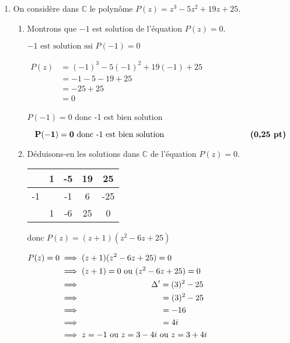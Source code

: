 \documentclass[12pt,a4paper]{article}
\begin{document}
\begin{enumerate}
    \item On considère dans \( \mathbb{C} \) le polynôme \( P(z) = z^3 - 5z^2 + 19z + 25 \).
    \begin{enumerate}
        \item Montrons que \( -1 \) est solution de l’équation \( P(z) = 0 \). 
        
        \(-1 \text{ est solution ssi } P(-1) = 0 \)
        
        \(
        \begin{aligned}
        P(z) &= (-1)^3 - 5(-1)^2 + 19(-1) + 25\\
        		 &= -1 - 5 - 19 + 25\\ 
        		 &= -25 + 25\\ 
        		 &=0      
        \end{aligned}
        \)

$P(-1) = 0$ donc -1 est bien solution

\begin{resultbox}
    \[
    \mathbf{P(-1) = 0 \text{ donc -1 est bien solution } \hspace{3.6cm}  \textbf{(0,25 pt)} }
    \]
\end{resultbox}     
     
        \item Déduisons-en les solutions dans \( \mathbb{C} \) de l’équation \( P(z) = 0 \).
        
\begin{tabular}{|c|c|c|c|c|}
        \hline
        & 1  & -5 & 19 & 25\\ 
        \hline
        -1 &   & -1 & 6 & -25\\ 
        \hline
        & 1  & -6 & 25 & 0\\ 
        \hline
\end{tabular} 

donc  \( P(z) = (z+1)(z^{2}-6z+25) \)

\( 
\begin{aligned}
P(z) = 0 &\implies (z+1)(z^{2}-6z+25) = 0\\
				 &\implies (z+1) = 0 \text{ ou }(z^{2}-6z+25) = 0\\
				 &\implies \hspace{3cm} \Delta' = (3)^{2}-25\\
				 &\implies \hspace{3.6cm}  				= (3)^{2}-25\\
				 &\implies \hspace{3.6cm}  				= -16\\
				 &\implies \hspace{3.6cm}  				= 4i\\
				 &\implies z=-1  \text{ ou } z = 3 - 4i \text{ ou } z = 3 + 4i
\end{aligned}
\)


\end{enumerate}
\end{enumerate}
\end{document}
